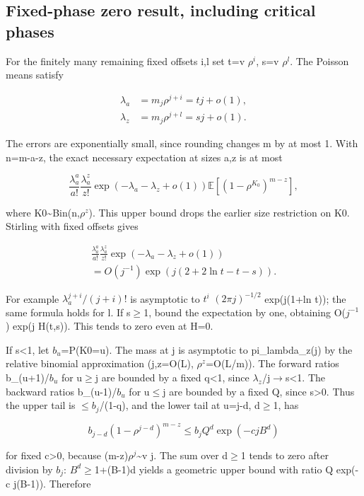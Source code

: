 \documentclass[11pt]{article}
\begin{document}
\subsection{Fixed-phase zero result, including critical phases}

For the finitely many remaining fixed offsets i,l set t=v $\rho^{i}$, s=v $\rho^{l}$. The Poisson means satisfy

\[
\begin{aligned}\lambda_a&=m_j\rho^{j+i}=tj+o(1),\\
\lambda_z&=m_j\rho^{j+l}=sj+o(1).\end{aligned}
\]

The errors are exponentially small, since rounding changes m by at most 1. With n=m-a-z, the exact necessary expectation at sizes a,z is at most

\[
\frac{\lambda_a^a}{a!}\frac{\lambda_a^z}{z!}
\exp(-\lambda_a-\lambda_z+o(1))\mathbb E[(1-\rho^{K_0})^{m-z}],
\]

where K0\textasciitilde{}Bin(n,$\rho^{z}$). This upper bound drops the earlier size restriction on K0. Stirling with fixed offsets gives

\[
\begin{gathered}\frac{\lambda_a^a}{a!}\frac{\lambda_a^z}{z!}\exp(-\lambda_a-\lambda_z+o(1))\\
{}=O(j^{-1})\exp(j(2+2\ln t-t-s)).\end{gathered}
\]

For example $\lambda_a^{j+i}/(j+i)!$ is asymptotic to $t^{i}$ $(2\pi j)^{-1/2}$ exp(j(1+ln t)); the same formula holds for l. If s\ensuremath{\geq}1, bound the expectation by one, obtaining O($j^{-1}$) exp(j H(t,s)). This tends to zero even at H=0.

If s<1, let $b_{u}$=P(K0=u). The mass at j is asymptotic to pi\_lambda\_z(j) by the relative binomial approximation (j,z=O(L), $\rho^{z}$=O(L/m)). The forward ratios b\_(u+1)/$b_{u}$ for u\ensuremath{\geq}j are bounded by a fixed q<1, since $\lambda_{z}$/j\ensuremath{\to}s<1. The backward ratios b\_(u-1)/$b_{u}$ for u\ensuremath{\leq}j are bounded by a fixed Q, since s>0. Thus the upper tail is \ensuremath{\leq}$b_{j}$/(1-q), and the lower tail at u=j-d, d\ensuremath{\geq}1, has

\[
b_{j-d}(1-\rho^{j-d})^{m-z}\leq b_jQ^d\exp(-cjB^d)
\]

for fixed c>0, because (m-z)$\rho^{j}$\textasciitilde{}v j. The sum over d\ensuremath{\geq}1 tends to zero after division by $b_{j}$: $B^{d}$\ensuremath{\geq}1+(B-1)d yields a geometric upper bound with ratio Q exp(-c j(B-1)). Therefore
\end{document}
